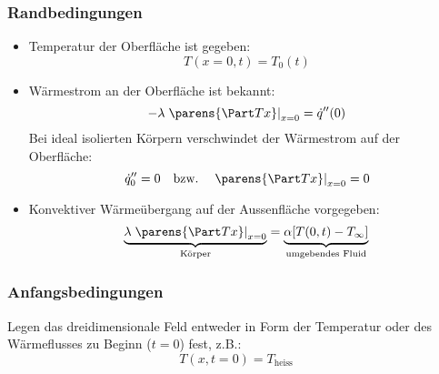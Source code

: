 		\subsubsection{Randbedingungen} %
			\begin{itemize}
				\item Temperatur der Oberfläche ist gegeben:
					\[
						T(x=0,t) = T_0(t)
					\]
				\item Wärmestrom an der Oberfläche ist bekannt:
					\[
						-\lambda \left.\parens{\Part T x}\right|_{x=0} = \dot q''(0)
					\]
					Bei ideal isolierten Körpern verschwindet der Wärmestrom auf der Oberfläche:
					\[
						\dot q_0'' = 0 \quad \text{bzw.} \quad \left.\parens{\Part T x}\right|_{x=0} = 0
					\]
				\item Konvektiver Wärmeübergang auf der Aussenfläche vorgegeben:
					\[
						\underbrace{\lambda \left.\parens{\Part T x}\right|_{x=0}}_\text{Körper} = \underbrace{\alpha [T(0,t) - T_\infty] \vphantom{\left.\parens{\Part T x}\right|_{x=0}}}_\text{umgebendes Fluid}
					\]
			\end{itemize}
		\subsubsection{Anfangsbedingungen} %
			Legen das dreidimensionale Feld entweder in Form der Temperatur oder des Wärmeflusses zu Beginn ($t=0$) fest, z.B.:
			\[
				T(x,t=0) = T_\text{heiss}
			\]
